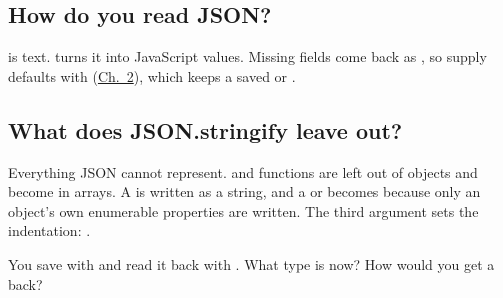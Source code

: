 \label{ch:c11}

\subsection{How do you read JSON?}%
 is text.  turns it into JavaScript values. Missing fields come back as , so supply defaults with  (\hyperref[ch:c02]{Ch.~2}), which keeps a saved  or .

\subsection{What does JSON.stringify leave out?}%
Everything JSON cannot represent.  and functions are left out of objects and become  in arrays. A  is written as a string, and a  or  becomes  because only an object's own enumerable properties are written. The third argument sets the indentation: .

\begin{ponder}You save  with  and read it back with . What type is  now? How would you get a  back?\end{ponder}
